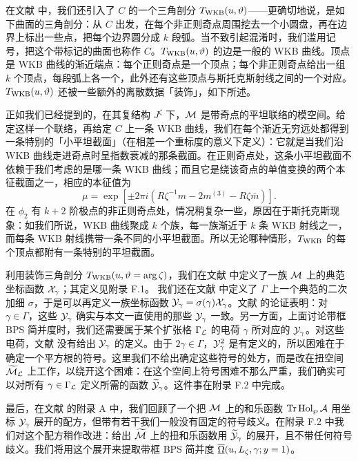 在文献 \cite{Gaiotto:2009hg} 中，我们还引入了 $C$ 的一个三角剖分 $T_{\rm WKB}(u, \vartheta)$——更确切地说，是如下曲面的三角剖分：从 $C$ 出发，在每个非正则奇点周围挖去一个小圆盘，再在边界上标出一些点，把每个边界圆分成 $k$ 段弧。当不致引起混淆时，我们滥用记号，把这个带标记的曲面也称作 $C$。$T_{\rm WKB}(u, \vartheta)$ 的边是一般的 WKB 曲线。顶点是 WKB 曲线的渐近端点：每个正则奇点是一个顶点；每个非正则奇点给出一组 $k$ 个顶点，每段弧上各一个，此外还有这些顶点与斯托克斯射线之间的一个对应。$T_{\rm WKB}(u, \vartheta)$ 还被一些额外的离散数据「装饰」，如下所述。

正如我们已经提到的，在其复结构 $J^\zeta$ 下，$\mathcal{M}$ 是带奇点的平坦联络的模空间。给定这样一个联络，再给定 $C$ 上一条 WKB 曲线，我们在每个渐近无穷远处都得到一条特别的「小平坦截面」（在相差一个重标度的意义下定义）：它就是当我们沿 WKB 曲线走进奇点时呈指数衰减的那条截面。在正则奇点处，这条小平坦截面不依赖于我们考虑的是哪一条 WKB 曲线；而且它是绕该奇点的单值变换的两个本征截面之一，相应的本征值为
\begin{equation}
 \mu = \exp \left[ \pm 2 \pi i \left( R \zeta^{-1} m - 2 m^{(3)} - R \zeta \bar{m} \right) \right].
\end{equation}
在 $\phi_2$ 有 $k+2$ 阶极点的非正则奇点处，情况稍复杂一些，原因在于斯托克斯现象：如我们所说，WKB 曲线聚成 $k$ 个族，每一族渐近于 $k$ 条 WKB 射线之一，而每条 WKB 射线携带一条不同的小平坦截面。所以无论哪种情形，$T_{\rm WKB}$ 的每个顶点都附有一条特别的平坦截面。

利用装饰三角剖分 $T_{\rm WKB}(u, \vartheta = \arg \zeta)$，我们在文献 \cite{Gaiotto:2009hg} 中定义了一族 $\mathcal{M}$ 上的典范坐标函数 $\mathcal{X}_\gamma$；其定义见附录 F.1。%
我们还在文献 \cite{Gaiotto:2009hg} 中定义了 $\Gamma$ 上一个典范的二次加细 $\sigma$，于是可以再定义一族坐标函数 $\mathcal{Y}_\gamma = \sigma(\gamma) \mathcal{X}_\gamma$。文献 \cite{Gaiotto:2009hg} 的论证表明：对 $\gamma \in \Gamma$，这些 $\mathcal{Y}_\gamma$ 确实与本文一直使用的那些 $\mathcal{Y}_\gamma$ 一致。另一方面，上面讨论带框 BPS 简并度时，我们还需要属于某个扩张格 $\Gamma_{\mathcal{L}}$ 的电荷 $\gamma$ 所对应的 $\mathcal{Y}_\gamma$。对这些电荷，文献 \cite{Gaiotto:2009hg} 没有给出 $\mathcal{Y}_\gamma$ 的定义。由于 $2\gamma \in \Gamma$，$\mathcal{Y}_\gamma^2$ 是有定义的，所以困难在于确定一个平方根的符号。这里我们不给出确定这些符号的处方，而是改在扭空间 $\widetilde{\cal M}_{\mathcal{L}}$ 上工作，以绕开这个困难：在这个空间上符号困难不那么严重，我们确实可以对所有 $\gamma \in \Gamma_{\mathcal{L}}$ 定义所需的函数 $\widetilde{\cal Y}_\gamma$。这件事在附录 F.2 中完成。%

最后，在文献 \cite{Gaiotto:2009hg} 的附录 A 中，我们回顾了一个把 $\mathcal{M}$ 上的和乐函数 $\operatorname{Tr} \operatorname{Hol}_\wp \mathcal{A}$ 用坐标 $\mathcal{Y}_\gamma$ 展开的配方，但带有若干我们一般没有固定的符号歧义。在附录 F.2%
中我们对这个配方稍作改进：给出 $\widetilde{\cal M}$ 上的扭和乐函数用 $\widetilde{\cal Y}_\gamma$ 的展开，且不带任何符号歧义。我们将用这个展开来提取带框 BPS 简并度 $\overline{\underline{\Omega}}(u, L_\zeta, \gamma; y = 1)$。

